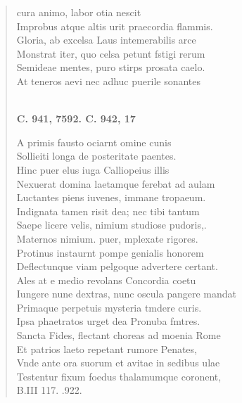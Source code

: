 \documentclass[11pt, a4paper]{report}
\begin{document}
\begin{verse}
cura animo, labor otia nescit \\ Improbus atque altis urit praecordia flammis. \\ Gloria, ab excelsa Laus intemerabilis arce \\ Monstrat iter, quo celsa petunt fstigi rerum \\ Semideae mentes, puro stirps prosata caelo. \\ At teneros aevi nec adhuc puerile sonantes \\ 
        ﻿\pagebreak 
    \begin{center} \textbf{C. 941, 7592. C. 942, 17} \end{center} \marginpar{[364]} A primis fausto ociarnt omine cunis \\ Sollieiti longa de posteritate paentes. \\ Hinc puer elus iuga Calliopeius illis \\ Nexuerat domina laetamque ferebat ad aulam \\ Luctantes piens iuvenes, immane tropaeum. \\ Indignata tamen risit dea; nec tibi tantum \\ Saepe licere velis, nimium studiose pudoris,. \\ Maternos nimium. puer, mplexate rigores. \\ Protinus instaurnt pompe genialis honorem \\ Deflectunque viam pelgoque advertere certant. \\ Ales at e medio revolans Concordia coetu \\ Iungere nune dextras, nunc oscula pangere mandat \\ Primaque perpetuis mysteria tmdere curis. \\ Ipsa phaetratos urget dea Pronuba fmtres. \\ Sancta Fides, flectant choreas ad moenia Rome \\ Et patrios laeto repetant rumore Penates, \\ Vnde ante ora suorum et avitae in sedibus ulae \\ Testentur fixum foedus thalamumque coronent, \\ B.III 117. .922. \\ 
      \end{verse}
  
\end{document}

